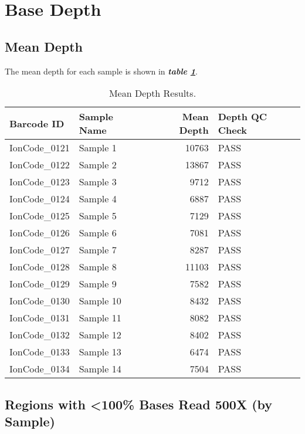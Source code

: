\documentclass[
]{article}
\begin{document}
\tableofcontents

\newpage

\hypertarget{base-depth}{%
\section{Base Depth}\label{base-depth}}

\hypertarget{mean-depth}{%
\subsection{Mean Depth}\label{mean-depth}}

The mean depth for each sample is shown in \textbf{\emph{table \ref{tab:meanDepthResults}}}.

\begin{longtable}[t]{llrl}
\caption{\label{tab:meanDepthResults}Mean Depth Results.}\\
\toprule
Barcode ID & Sample Name & Mean Depth & Depth QC Check\\
\midrule
IonCode\_0121 & Sample 1 & 10763 & PASS\\
IonCode\_0122 & Sample 2 & 13867 & PASS\\
IonCode\_0123 & Sample 3 & 9712 & PASS\\
IonCode\_0124 & Sample 4 & 6887 & PASS\\
IonCode\_0125 & Sample 5 & 7129 & PASS\\
\addlinespace
IonCode\_0126 & Sample 6 & 7081 & PASS\\
IonCode\_0127 & Sample 7 & 8287 & PASS\\
IonCode\_0128 & Sample 8 & 11103 & PASS\\
IonCode\_0129 & Sample 9 & 7582 & PASS\\
IonCode\_0130 & Sample 10 & 8432 & PASS\\
\addlinespace
IonCode\_0131 & Sample 11 & 8082 & PASS\\
IonCode\_0132 & Sample 12 & 8402 & PASS\\
IonCode\_0133 & Sample 13 & 6474 & PASS\\
IonCode\_0134 & Sample 14 & 7504 & PASS\\
\bottomrule
\end{longtable}

\hypertarget{regions-with-100-bases-read-500x-by-sample}{%
\subsection{Regions with \textless100\% Bases Read 500X (by Sample)}\label{regions-with-100-bases-read-500x-by-sample}}
\end{document}
